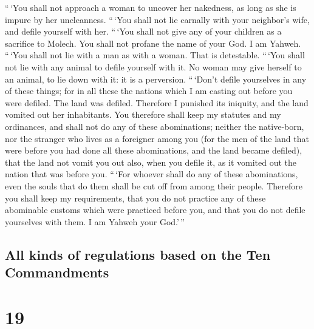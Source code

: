  ``\,`You shall not approach a woman to uncover her
nakedness, as long as she is impure by her uncleanness. 
``\,`You shall not lie carnally with your neighbor's wife, and defile
yourself with her.  ``\,`You shall not give any of your
children as a sacrifice to Molech. You shall not profane the name of
your God. I am Yahweh.  ``\,`You shall not lie with a man
as with a woman. That is detestable.  ``\,`You shall not
lie with any animal to defile yourself with it. No woman may give
herself to an animal, to lie down with it: it is a perversion.
 ``\,`Don't defile yourselves in any of these things; for
in all these the nations which I am casting out before you were defiled.
 The land was defiled. Therefore I punished its iniquity,
and the land vomited out her inhabitants.  You therefore
shall keep my statutes and my ordinances, and shall not do any of these
abominations; neither the native-born, nor the stranger who lives as a
foreigner among you  (for the men of the land that were
before you had done all these abominations, and the land became
defiled),  that the land not vomit you out also, when you
defile it, as it vomited out the nation that was before you.
 ``\,`For whoever shall do any of these abominations,
even the souls that do them shall be cut off from among their people.
 Therefore you shall keep my requirements, that you do
not practice any of these abominable customs which were practiced before
you, and that you do not defile yourselves with them. I am Yahweh your
God.'\,''

\hypertarget{all-kinds-of-regulations-based-on-the-ten-commandments}{%
\subsection{All kinds of regulations based on the Ten
Commandments}\label{all-kinds-of-regulations-based-on-the-ten-commandments}}

\hypertarget{section-18}{%
\section{19}\label{section-18}}


